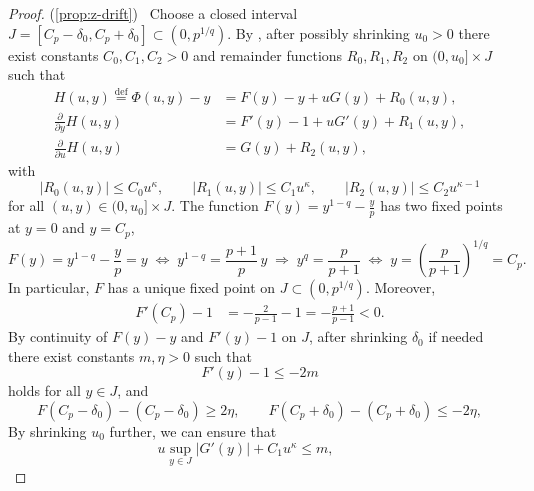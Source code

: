\documentclass{article}
\newcommand{\defi}{\stackrel{\mathrm{\scriptscriptstyle def}}{=}}
\newcommand{\newtarget}[1]{\hypertarget{#1}{}}
\newcommand\linkofproof[1]{(\cref{#1})\newtarget{proof:#1}\ }
\begin{document}
\begin{proof}\linkofproof{prop:z-drift}
    Choose a closed interval $J=[C_p-\delta_0,C_p+\delta_0]\subset(0,p^{1/q})$.
    By , after possibly shrinking $u_0>0$ there exist constants
    $C_0,C_1,C_2>0$ and remainder functions $R_0,R_1,R_2$ on
    $(0,u_0]\times J$ such that
    \begin{align}
        H(u,y)\defi \Phi(u,y)-y
        &= F(y)-y+uG(y)+R_0(u,y), \label{eq:H-expand}\\
        \frac{\partial}{\partial y} H(u,y)
        &= F'(y)-1+uG'(y)+R_1(u,y), \label{eq:Hy-expand}\\
        \frac{\partial}{\partial u} H(u,y)
        &= G(y)+R_2(u,y), \label{eq:Hu-expand}
    \end{align}
    with
    \begin{equation}
        \label{eq:R-bounds}
        |R_0(u,y)|\le C_0u^\kappa,
        \qquad
        |R_1(u,y)|\le C_1u^\kappa,
        \qquad
        |R_2(u,y)|\le C_2u^{\kappa-1}
    \end{equation}
    for all $(u,y)\in(0,u_0]\times J$.
    The function $F(y) = y^{1-q} - \frac{y}{p}$ has two fixed points at $y=0$ and $y=C_p$, 
    \[
        F(y) = y^{1-q}-\frac{y}{p}=y \;\Longleftrightarrow\;
        y^{1-q}=\frac{p+1}{p}\,y \;\Longrightarrow\;
        y^q=\frac{p}{p+1} \;\Longleftrightarrow\;
        y=\left(\frac{p}{p+1}\right)^{1/q} = C_p.
    \]
    In particular, $F$ has a unique fixed point on $J \subset (0,p^{1/q})$.
    Moreover,
    \begin{align*}
    F'(C_p)-1
        &=-\frac{2}{p-1}-1
        =-\frac{p+1}{p-1}<0.
    \end{align*}
    By continuity of $F(y)-y$ and $F'(y)-1$ on $J$, after shrinking $\delta_0$ if
    needed there exist constants $m,\eta>0$ such that
    \[
        F'(y)-1\le -2m
    \]
    holds for all $y\in J$, and
    \[
        F(C_p-\delta_0)-(C_p-\delta_0)\ge 2\eta,
        \qquad
        F(C_p+\delta_0)-(C_p+\delta_0)\le -2\eta,
    \]
    By shrinking $u_0$ further, we can ensure that
    \[
        u\sup_{y\in J}|G'(y)|+C_1u^\kappa\le m,\qquad
\]
\end{proof}
\end{document}
